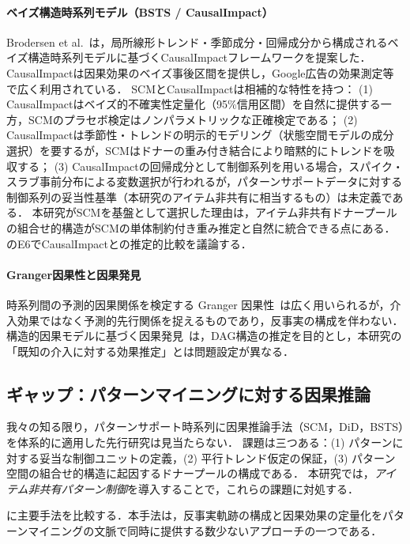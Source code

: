 \paragraph{ベイズ構造時系列モデル（BSTS / CausalImpact）} Brodersen et al.~\cite{brodersen2015inferring}は，局所線形トレンド・季節成分・回帰成分から構成されるベイズ構造時系列モデルに基づくCausalImpactフレームワークを提案した．
CausalImpactは因果効果のベイズ事後区間を提供し，Google広告の効果測定等で広く利用されている．
SCMとCausalImpactは相補的な特性を持つ：
(1) CausalImpactはベイズ的不確実性定量化（95\%信用区間）を自然に提供する一方，SCMのプラセボ検定はノンパラメトリックな正確検定である；
(2) CausalImpactは季節性・トレンドの明示的モデリング（状態空間モデルの成分選択）を要するが，SCMはドナーの重み付き結合により暗黙的にトレンドを吸収する；
(3) CausalImpactの回帰成分として制御系列を用いる場合，スパイク・スラブ事前分布による変数選択が行われるが，パターンサポートデータに対する制御系列の妥当性基準（本研究のアイテム非共有に相当するもの）は未定義である．
本研究がSCMを基盤として選択した理由は，アイテム非共有ドナープールの組合せ的構造がSCMの単体制約付き重み推定と自然に統合できる点にある．
のE6でCausalImpactとの推定的比較を議論する．

\paragraph{Granger因果性と因果発見} 時系列間の予測的因果関係を検定する Granger 因果性~\cite{granger1969investigating}は広く用いられるが，介入効果ではなく予測的先行関係を捉えるものであり，反事実の構成を伴わない．
構造的因果モデルに基づく因果発見~\cite{peters2017elements}は，DAG構造の推定を目的とし，本研究の「既知の介入に対する効果推定」とは問題設定が異なる．

\subsection{ギャップ：パターンマイニングに対する因果推論}

我々の知る限り，パターンサポート時系列に因果推論手法（SCM，DiD，BSTS）を体系的に適用した先行研究は見当たらない．
課題は三つある：(1) パターンに対する妥当な制御ユニットの定義，(2) 平行トレンド仮定の保証，(3) パターン空間の組合せ的構造に起因するドナープールの構成である．
本研究では，\emph{アイテム非共有パターン制御}を導入することで，これらの課題に対処する．

 に主要手法を比較する．本手法は，反事実軌跡の構成と因果効果の定量化をパターンマイニングの文脈で同時に提供する数少ないアプローチの一つである．

